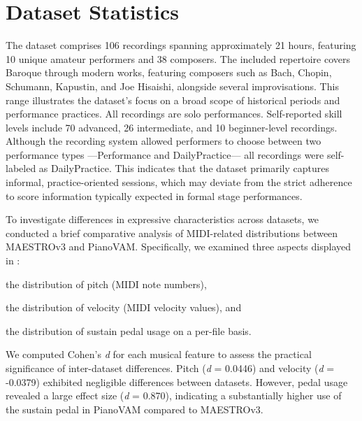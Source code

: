\documentclass{article}
\begin{document}


\section{Dataset Statistics}\label{sec:dataset-statistics}

The dataset comprises 106 recordings spanning approximately 21 hours, featuring 10 unique amateur performers and 38 composers. The included repertoire covers Baroque through modern works, featuring composers such as Bach, Chopin, Schumann, Kapustin, and Joe Hisaishi, alongside several improvisations. This range illustrates the dataset's focus on a broad scope of historical periods and performance practices. All recordings are solo performances. Self-reported skill levels include 70 advanced, 26 intermediate, and 10 beginner-level recordings. Although the recording system allowed performers to choose between two performance types ---Performance and DailyPractice--- all recordings were self-labeled as DailyPractice. This indicates that the dataset primarily captures informal, practice-oriented sessions, which may deviate from the strict adherence to score information typically expected in formal stage performances. 

To investigate differences in expressive characteristics across datasets, we conducted a brief comparative analysis of MIDI-related distributions between MAESTROv3 and PianoVAM. Specifically, we examined three aspects displayed in : 
\begin{inparaenum}[(i)]
    \item the distribution of pitch (MIDI note numbers), 
    \item the distribution of velocity (MIDI velocity values), and 
    \item the distribution of sustain pedal usage on a per-file basis.
\end{inparaenum}
We computed Cohen's \textit{d} for each musical feature to assess the practical significance of inter-dataset differences.  Pitch (\textit{d} = 0.0446) and velocity (\textit{d} = -0.0379) exhibited negligible differences between datasets. However, pedal usage revealed a large effect size (\textit{d} = 0.870), indicating a substantially higher use of the sustain pedal in PianoVAM compared to MAESTROv3. 
 
\end{document}

